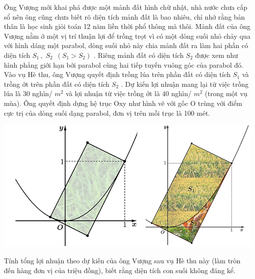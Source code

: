  \begin{ex}%
Ông Vượng mới khai phá được một mảnh đất hình chữ nhật, nhà nước chưa cấp sổ nên ông cũng chưa biết rõ diện tích mảnh đất là bao nhiêu, chỉ nhớ rằng bản thân là học sinh giỏi toán 12 năm liền thời phổ thông mà thôi. Mảnh đất của ông Vượng nằm ở một vị trí thuận lợi để trồng trọt vì có một dòng suối nhỏ chảy qua với hình dáng một parabol, dòng suối nhỏ này chia mảnh đất ra làm hai phần có diện tích $S_1\,,\,\,S_2\,\,\,\left(S_1>S_2\right)$ . Riêng mảnh đất có diện tích $S_2$ được xem như hình phẳng giới hạn bởi parabol cùng hai tiếp tuyến vuông góc của parabol đó.
Vào vụ Hè thu, ông Vượng quyết định trồng lúa trên phần đất có diện tích $S_1$ và trồng ớt trên phần đất có diện tích $S_2$ . Dự kiến lợi nhuận mang lại từ việc trồng lúa là $30$ nghìn/ $m^2$ và lợi nhuận từ việc trồng ớt là $40$ nghìn/ $m^2$ (trong một vụ mùa).
Ông quyết định dựng hệ trục Oxy như hình vẽ với gốc O trùng với điểm cực trị của dòng suối dạng parabol, đơn vị trên mỗi trục là 100 mét.
\begin{center}
    \includegraphics[scale=.5]{img/HXN-6.21}
\end{center}
 Tính tổng lợi nhuận theo dự kiến của ông Vượng sau vụ Hè thu này (làm tròn đến hàng đơn vị của triệu đồng), biết rằng diện tích con suối không đáng kể.


\end{ex}
